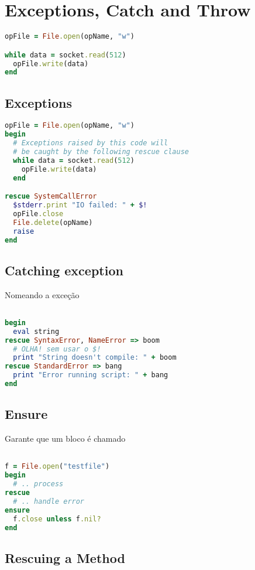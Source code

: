 \documentclass[serif,mathserif]{book}
\begin{document}
\chapter{Exceptions, Catch and Throw}

\begin{lstlisting}[language=ruby]
opFile = File.open(opName, "w")

while data = socket.read(512)
  opFile.write(data)
end
\end{lstlisting}

\section{Exceptions}

\begin{lstlisting}[language=ruby]
opFile = File.open(opName, "w")
begin
  # Exceptions raised by this code will
  # be caught by the following rescue clause
  while data = socket.read(512)
    opFile.write(data)
  end

rescue SystemCallError
  $stderr.print "IO failed: " + $!
  opFile.close
  File.delete(opName)
  raise
end
\end{lstlisting}

\section{Catching exception}

Nomeando a exceção

\begin{lstlisting}[language=ruby]

begin
  eval string
rescue SyntaxError, NameError => boom
  # OLHA! sem usar o $!
  print "String doesn't compile: " + boom
rescue StandardError => bang
  print "Error running script: " + bang
end
\end{lstlisting}

\section{Ensure}

Garante que um bloco é chamado

\begin{lstlisting}[language=ruby]

f = File.open("testfile")
begin
  # .. process
rescue
  # .. handle error
ensure
  f.close unless f.nil?
end
\end{lstlisting}

\section{Rescuing a Method}
\end{document}
